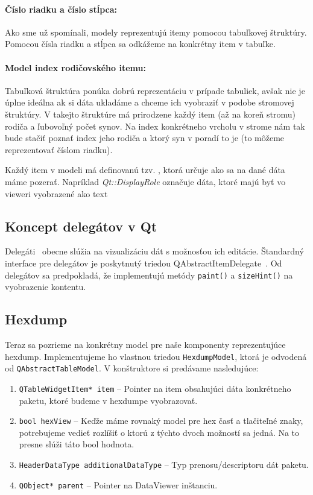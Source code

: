 \paragraph{Číslo riadku a číslo stĺpca:} Ako sme už spomínali, modely reprezentujú itemy pomocou tabuľkovej štruktúry. Pomocou čísla riadku a stĺpca sa odkážeme na konkrétny item v tabuľke.
\paragraph{Model index rodičovského itemu:}  Tabuľková štruktúra ponúka dobrú reprezentáciu v prípade tabuliek, avšak nie je úplne ideálna ak si dáta ukladáme a chceme ich vyobraziť v podobe stromovej štruktúry. V takejto štruktúre má prirodzene každý item (až na koreň stromu) rodiča a ľubovoľný počet synov. Na index konkrétneho vrcholu v strome nám tak bude stačiť poznať index jeho rodiča a ktorý syn v poradí to je (to môžeme reprezentovať číslom riadku).

Každý item v modeli má definovanú tzv. , ktorá určuje ako sa na dané dáta máme pozerať. Napríklad \textit{Qt::DisplayRole} označuje dáta, ktoré majú byť vo vieweri vyobrazené ako text


\subsection{Koncept delegátov v Qt}
\label{kap04:sec:delegate}
Delegáti~\cite{qt_delegate} obecne slúžia na vizualizáciu dát s možnosťou ich editácie. Štandardný interface pre delegátov je poskytnutý triedou QAbstractItemDelegate~\cite{qabstractitemdelegate}. Od delegátov sa predpokladá, že implementujú metódy \texttt{paint()} a \texttt{sizeHint()} na vyobrazenie kontentu.


\subsection{Hexdump}
Teraz sa pozrieme na konkrétny model pre naše komponenty reprezentujúce hexdump. Implementujeme ho vlastnou triedou \texttt{HexdumpModel}, ktorá je odvodená od \texttt{QAbstractTableModel}. V konštruktore si predávame nasledujúce:
\begin{enumerate}
\item \texttt{QTableWidgetItem* item} -- Pointer na item obsahujúci dáta konkrétneho paketu, ktoré budeme v hexdumpe vyobrazovať.

\item \texttt{bool hexView} -- Keďže máme rovnaký model pre hex časť a tlačiteľné znaky, potrebujeme vedieť rozlíšiť o ktorú z týchto dvoch možností sa jedná. Na to presne slúži táto bool hodnota.

\item \texttt{HeaderDataType additionalDataType} -- Typ prenosu/descriptoru dát paketu.

\item \texttt{QObject* parent} -- Pointer na DataViewer inštanciu.
\end{enumerate}

